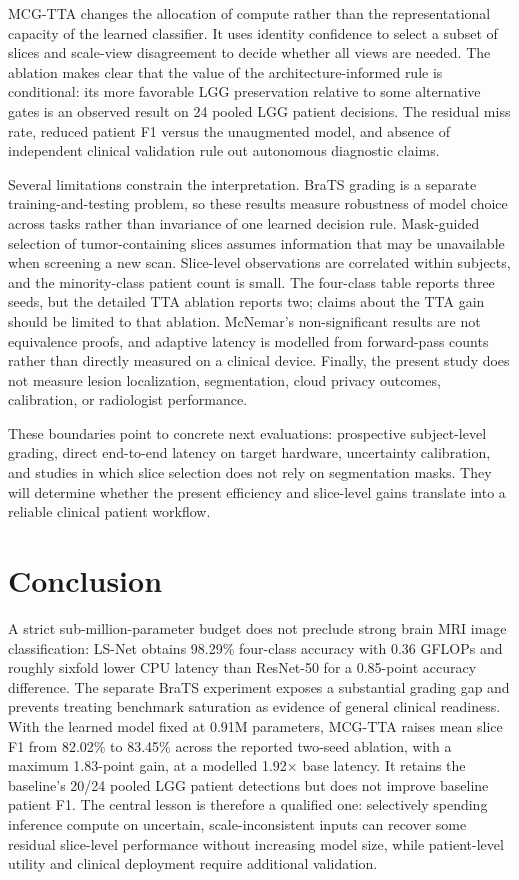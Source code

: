 ﻿\documentclass[journal]{IEEEtran}
\begin{document}
MCG-TTA changes the allocation of compute rather than the representational capacity of the learned classifier. It uses identity confidence to select a subset of slices and scale-view disagreement to decide whether all views are needed. The ablation makes clear that the value of the architecture-informed rule is conditional: its more favorable LGG preservation relative to some alternative gates is an observed result on 24 pooled LGG patient decisions. The residual miss rate, reduced patient F1 versus the unaugmented model, and absence of independent clinical validation rule out autonomous diagnostic claims.

Several limitations constrain the interpretation. BraTS grading is a separate training-and-testing problem, so these results measure robustness of model choice across tasks rather than invariance of one learned decision rule. Mask-guided selection of tumor-containing slices assumes information that may be unavailable when screening a new scan. Slice-level observations are correlated within subjects, and the minority-class patient count is small. The four-class table reports three seeds, but the detailed TTA ablation reports two; claims about the TTA gain should be limited to that ablation. McNemar's non-significant results are not equivalence proofs, and adaptive latency is modelled from forward-pass counts rather than directly measured on a clinical device. Finally, the present study does not measure lesion localization, segmentation, cloud privacy outcomes, calibration, or radiologist performance.

These boundaries point to concrete next evaluations: prospective subject-level grading, direct end-to-end latency on target hardware, uncertainty calibration, and studies in which slice selection does not rely on segmentation masks. They will determine whether the present efficiency and slice-level gains translate into a reliable clinical patient workflow.


\section{Conclusion}

A strict sub-million-parameter budget does not preclude strong brain MRI image classification: LS-Net obtains 98.29\% four-class accuracy with 0.36 GFLOPs and roughly sixfold lower CPU latency than ResNet-50 for a 0.85-point accuracy difference. The separate BraTS experiment exposes a substantial grading gap and prevents treating benchmark saturation as evidence of general clinical readiness. With the learned model fixed at 0.91M parameters, MCG-TTA raises mean slice F1 from 82.02\% to 83.45\% across the reported two-seed ablation, with a maximum 1.83-point gain, at a modelled 1.92$\times$ base latency. It retains the baseline's 20/24 pooled LGG patient detections but does not improve baseline patient F1. The central lesson is therefore a qualified one: selectively spending inference compute on uncertain, scale-inconsistent inputs can recover some residual slice-level performance without increasing model size, while patient-level utility and clinical deployment require additional validation.
\end{document}
